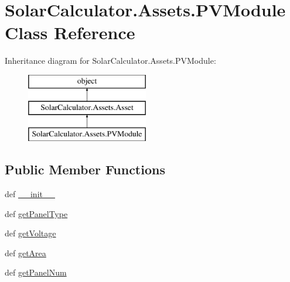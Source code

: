 \hypertarget{class_solar_calculator_1_1_assets_1_1_p_v_module}{\section{Solar\-Calculator.\-Assets.\-P\-V\-Module Class Reference}
\label{class_solar_calculator_1_1_assets_1_1_p_v_module}
}
Inheritance diagram for Solar\-Calculator.\-Assets.\-P\-V\-Module\-:\begin{figure}[H]
\begin{center}
\leavevmode
\includegraphics[height=3.000000cm]{class_solar_calculator_1_1_assets_1_1_p_v_module}
\end{center}
\end{figure}
\subsection*{Public Member Functions}
\begin{DoxyCompactItemize}
\item 
def \hyperlink{class_solar_calculator_1_1_assets_1_1_p_v_module_a28e6af308b164ad7e2e86f813f1f09fa}{\-\_\-\-\_\-init\-\_\-\-\_\-}
\item 
def \hyperlink{class_solar_calculator_1_1_assets_1_1_p_v_module_ab9ae6fda201486b13d632f99c972a5c6}{get\-Panel\-Type}
\item 
def \hyperlink{class_solar_calculator_1_1_assets_1_1_p_v_module_aa2e3500cae37ebfa572995f0591b0cdb}{get\-Voltage}
\item 
def \hyperlink{class_solar_calculator_1_1_assets_1_1_p_v_module_a79197d94d9d11d05150129be4c76c94c}{get\-Area}
\item 
def \hyperlink{class_solar_calculator_1_1_assets_1_1_p_v_module_a093c382665a02e63a2c2f4acce806d76}{get\-Panel\-Num}
\end{DoxyCompactItemize}
